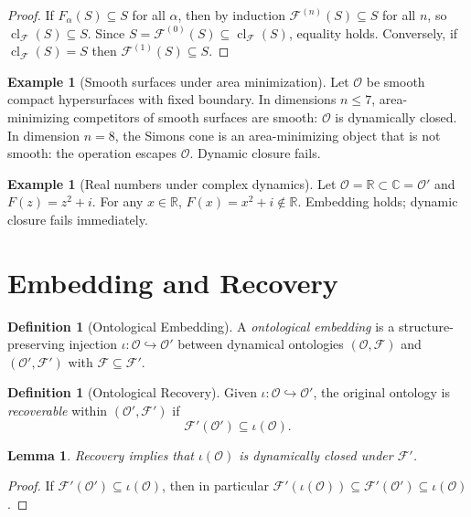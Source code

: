 \documentclass[12pt,oneside]{book}
\theoremstyle{plain}
\newtheorem{lemma}[theorem]{Lemma}
\theoremstyle{definition}
\newtheorem{definition}[theorem]{Definition}
\newtheorem{example}[theorem]{Example}
\theoremstyle{remark}
\newcommand{\Oold}{\mathcal{O}}
\newcommand{\Onew}{\mathcal{O}'}
\newcommand{\F}{\mathcal{F}}
\newcommand{\cl}{\operatorname{cl}}
\newcommand{\Real}{\mathbb{R}}
\begin{document}
\begin{proof}
If $F_\alpha(S) \subseteq S$ for all $\alpha$, then by induction
$\F^{(n)}(S) \subseteq S$ for all $n$, so $\cl_\F(S) \subseteq S$.
Since $S = \F^{(0)}(S) \subseteq \cl_\F(S)$, equality holds. Conversely,
if $\cl_\F(S) = S$ then $\F^{(1)}(S) \subseteq S$.
\end{proof}

\begin{example}[Smooth surfaces under area minimization]
Let $\Oold$ be smooth compact hypersurfaces with fixed boundary. In
dimensions $n \leq 7$, area-minimizing competitors of smooth surfaces are
smooth: $\Oold$ is dynamically closed. In dimension $n = 8$, the Simons
cone is an area-minimizing object that is not smooth: the operation escapes
$\Oold$. Dynamic closure fails.
\end{example}

\begin{example}[Real numbers under complex dynamics]
\label{ex:complex}
Let $\Oold = \Real \subset \mathbb{C} = \Onew$ and $F(z) = z^2 + i$.
For any $x \in \Real$, $F(x) = x^2 + i \notin \Real$. Embedding holds;
dynamic closure fails immediately.
\end{example}

\section{Embedding and Recovery}

\begin{definition}[Ontological Embedding]
\label{def:embedding}
A \emph{ontological embedding} is a structure-preserving injection
$\iota : \Oold \hookrightarrow \Onew$ between dynamical ontologies
$(\Oold, \F)$ and $(\Onew, \F')$ with $\F \subseteq \F'$.
\end{definition}

\begin{definition}[Ontological Recovery]
\label{def:recovery}
Given $\iota : \Oold \hookrightarrow \Onew$, the original ontology is
\emph{recoverable} within $(\Onew, \F')$ if
\[
  \F'(\Onew) \subseteq \iota(\Oold).
\]
\end{definition}

\begin{lemma}
Recovery implies that $\iota(\Oold)$ is dynamically closed under $\F'$.
\end{lemma}

\begin{proof}
If $\F'(\Onew) \subseteq \iota(\Oold)$, then in particular
$\F'(\iota(\Oold)) \subseteq \F'(\Onew) \subseteq \iota(\Oold)$.
\end{proof}
\end{document}
